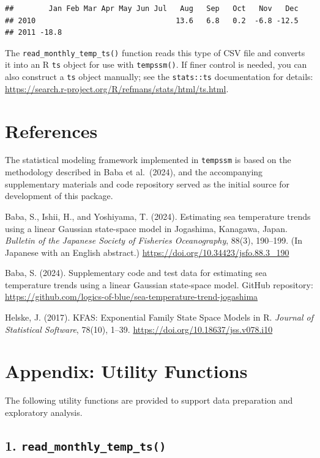 \documentclass[
]{article}
\begin{document}
\begin{verbatim}
##        Jan Feb Mar Apr May Jun Jul   Aug   Sep   Oct   Nov   Dec
## 2010                                13.6   6.8   0.2  -6.8 -12.5
## 2011 -18.8
\end{verbatim}

The \texttt{read\_monthly\_temp\_ts()} function reads this type of CSV
file and converts it into an R \texttt{ts} object for use with
\texttt{tempssm()}. If finer control is needed, you can also construct a
\texttt{ts} object manually; see the \texttt{stats::ts} documentation
for details:
\url{https://search.r-project.org/R/refmans/stats/html/ts.html}.

\section{References}\label{references}

The statistical modeling framework implemented in \texttt{tempssm} is
based on the methodology described in Baba et al.~(2024), and the
accompanying supplementary materials and code repository served as the
initial source for development of this package.

Baba, S., Ishii, H., and Yoshiyama, T. (2024). Estimating sea
temperature trends using a linear Gaussian state-space model in
Jogashima, Kanagawa, Japan. \emph{Bulletin of the Japanese Society of
Fisheries Oceanography}, 88(3), 190--199. (In Japanese with an English
abstract.) \url{https://doi.org/10.34423/jsfo.88.3_190}

Baba, S. (2024). Supplementary code and test data for estimating sea
temperature trends using a linear Gaussian state-space model. GitHub
repository:
\url{https://github.com/logics-of-blue/sea-temperature-trend-jogashima}

Helske, J. (2017). KFAS: Exponential Family State Space Models in R.
\emph{Journal of Statistical Software}, 78(10), 1--39.
\url{https://doi.org/10.18637/jss.v078.i10}

\section{Appendix: Utility Functions}\label{appendix-utility-functions}

The following utility functions are provided to support data preparation
and exploratory analysis.

\subsection{\texorpdfstring{1.
\texttt{read\_monthly\_temp\_ts()}}{1. read\_monthly\_temp\_ts()}}\label{read_monthly_temp_ts}
\end{document}
